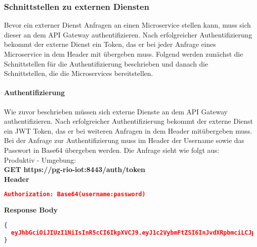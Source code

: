 \subsubsection{Schnittstellen zu externen Diensten}
\label{sec:arch:iot:se}
Bevor ein externer Dienst Anfragen an einen Microservice stellen kann, muss sich dieser an dem API Gateway authentifizieren.
Nach erfolgreicher Authentifizierung bekommt der externe Dienst ein Token, das er bei jeder Anfrage eines Microservice in dem Header mit übergeben muss.
Folgend werden zunächst die Schnittstellen für die Authentifizierung beschrieben und danach die Schnittstellen, die die Microservices bereitstellen.


\paragraph{Authentifizierung}
Wie zuvor beschrieben müssen sich externe Dienste an dem API Gateway authentifizieren.
Nach erfolgreicher Authentifizierung bekommt der externe Dienst ein JWT Token, das er bei weiteren Anfragen in dem Header mitübergeben muss.
\\
Bei der Anfrage zur Authentifizierung muss im Header der Username sowie das Passwort in Base64 übergeben werden.
Die Anfrage sieht wie folgt aus:
\newline
\\
Produktiv - Umgebung:
\\
\textbf{GET https://pg-rio-iot:8443/auth/token}
\\
\textbf{Header}
\begin{lstlisting}[language=json,firstnumber=1,basicstyle=\footnotesize]
Authorization: Base64(username:password)
\end{lstlisting}
\textbf{Response Body}
\begin{lstlisting}[language=json,firstnumber=1,basicstyle=\footnotesize]
{
  eyJhbGciOiJIUzI1NiIsInR5cCI6IkpXVCJ9.eyJ1c2VybmFtZSI6InJvdXRpbmciLCJpYXQiOjE1Njg3MDk0NTIsImV4cCI6MTU2ODc0NTQ1Mn0.-HYeAqEKM0RPGNYIIiHZRTqAbpS0PvpMthafzlq0QVw
}
\end{lstlisting}

